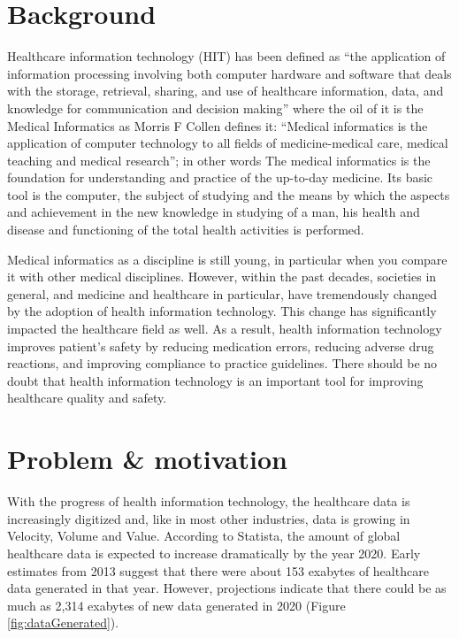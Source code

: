 \section{Background}
Healthcare information technology (HIT) has been defined as \enquote{the application of information processing involving both computer hardware and software that deals with the storage, retrieval, sharing, and use of healthcare information, data, and knowledge for communication and decision making\cite{brailer2004decade}} where the oil of it is the Medical Informatics as Morris F Collen defines it: \enquote{Medical informatics is the application of computer technology to all fields of medicine-medical care, medical teaching and medical research}; in other words The medical informatics is the foundation for understanding and practice of the up-to-day medicine. Its basic tool is the computer, the subject of studying and the means by which the aspects and achievement in the new knowledge in studying of a man, his health and disease and functioning of the total health activities is performed\cite{masic2013history}.

Medical informatics as a discipline is still young, in particular when you compare it with other medical disciplines. However, within the past decades, societies in general, and medicine and healthcare in particular, have tremendously changed by the adoption of health information technology. This change has significantly impacted the healthcare field as well\cite{haux2010medical}. As a result,  health information technology improves patient’s safety by reducing medication errors, reducing adverse drug reactions, and improving compliance to practice guidelines. There should be no doubt that health information technology is an important tool for improving healthcare quality and safety\cite{alotaibi2017impact}.


\section{Problem \& motivation}
With the progress of health information technology, the healthcare data is increasingly digitized and, like in most other industries, data is growing in Velocity, Volume and Value. According to Statista\cite{HealthcareDataVolume}, the amount of global healthcare data is expected to increase dramatically by the year 2020. Early estimates from 2013 suggest that there were about 153 exabytes of healthcare data generated in that year. However, projections indicate that there could be as much as 2,314 exabytes of new data generated in 2020 (Figure \ref{fig:dataGenerated}).

